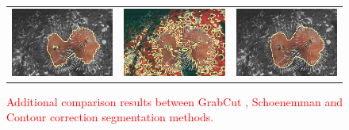 \documentclass[smallextended]{svjour3}       %
\newcommand{\revision}[1]{\textcolor{red}{#1}}
\begin{document}
{{\begin{figure}[hp!]
\begin{tabular}{ccc}
		\includegraphics[scale=0.2]{segmentation_bc_coral_gc-seg.png} &
		\includegraphics[scale=0.2]{segmentation_schoenemann_coral_coral-seg.png} &
		\includegraphics[scale=0.2]{segmentation_bc_coral_corrected-seg.png}								
	\end{tabular}
	\caption{\revision{Additional comparison results between GrabCut \cite{rother04grabcut}, Schoenemman  \cite{schoenemann09linear} and Contour correction segmentation methods.}}
	\label{fig:more-segmentation-results}	
\end{figure}


}}
\end{document}
